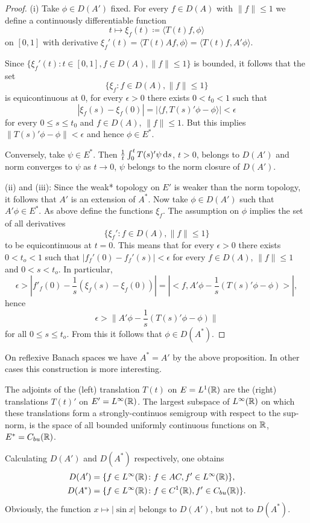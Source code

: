 \begin{proof}
(i) Take $\phi \in D(A')$ fixed.
For every $f \in D(A)$ with $\|f\| \leq 1$ we define a continuously differentiable function
\[
    t \mapsto \xi_{f}(t) \coloneqq \langle T(t)f,\phi \rangle
\]
on $\left[ 0,1 \right]$ with derivative $\xi_{f}'(t) = \langle T(t)Af,\phi \rangle = \langle T(t)f,A'\phi \rangle$.

Since $\{\xi_{f}'(t) \colon t \in \left[ 0,1 \right], f \in D(A), \|f\| \leq 1\}$ is bounded, it follows that the set
\[
    \{\xi_{f} \colon f \in D(A), \|f\| \leq 1\}
\]
is equicontinuous at $0$, \ie for every $\epsilon > 0$ there exists $0 < t_{0} < 1$ such that
\[
    |\xi_{f}(s) - \xi_{f}(0)| = |\langle f,T(s)'\phi - \phi \rangle| < \epsilon
\]
for every $0 \leq s \leq t_{0}$ and $f \in D(A)$, $\|f\| \leq 1$.
But this implies $\|T(s)'\phi - \phi\| < \epsilon$ and hence $\phi \in E^{*}$.

Conversely, take $\psi \in E^{*}$.
Then $\frac{1}{t}\int_{0}^{t} T(s)'\psi \mathop{}\!\mathrm{d}{s}$, $t > 0$, belongs to $D(A')$ and norm converges to $\psi$ as $t \to 0$, \ie $\psi$ belongs to the norm closure of $D(A')$.

(ii) and (iii): Since the weak* topology on $E'$ is weaker than the norm topology, it follows that $A'$ is an extension of $A^{*}$.
Now take $\phi \in D(A')$ such that $A'\phi \in E^{*}$.
As above define the functions $\xi_{f}$. 
The assumption on $\phi$ implies the set of all derivatives
\[
\{\xi_{f}' \colon f \in D(A), \|f\| \leq 1\}
\]
to be equicontinuous at $t = 0$. 
This means that for every $\epsilon > 0$ there exists $0 < t_o < 1$ such that $|f_f'(0) - f_f'(s)| < \epsilon$ for every $f \in D(A)$, $\|f\| \leq 1$ and $0 < s < t_o$.
In particular,
\[
    \epsilon > |f'_f(0) - \frac{1}{s}(\xi_f(s)-\xi_f(0))| = |<f,A'\phi - \frac{1}{s}(T(s)'\phi-\phi)>| ,
\]
hence
\[
    \epsilon > \|A'\phi - \frac{1}{s}(T(s)'\phi-\phi)\|
\]
for all $0 \leq s \leq t_o$.
From this it follows that $\phi \in D(A^*)$.
\end{proof}
On reflexive Banach spaces we have $A^* = A'$ by the above proposition.
In other cases this construction is more interesting.
\begin{example}[continued]\label{ex:a1-3.4}
The adjoints of the (left) translation $T(t)$ on $E = L^1(\mathbb{R})$ are the (right) translations $T(t)'$ on $E' = L^\infty(\mathbb{R})$.
The largest subspace of $L^\infty(\mathbb{R})$ on which these translations form a strongly-continuos semigroup with respect to the sup-norm, is the space of all bounded uniformly continuous functions on $\mathbb{R}$, \ie $E^* = C_{bu}(\mathbb{R})$.

Calculating $D(A')$ and $D(A^*)$ respectively, one obtains
\begin{align*}
    D(A') &= \{f \in L^\infty(\mathbb{R}) \colon f \in AC, f' \in L^\infty(\mathbb{R})\}, \\
    D(A^*) &= \{f \in L^\infty(\mathbb{R}) \colon f \in C^1(\mathbb{R}), f' \in C_{bu}(\mathbb{R})\}.
\end{align*}
Obviously, the function $x \mapsto |\sin x|$ belongs to $D(A')$, but not to $D(A^*)$.
\end{example}
